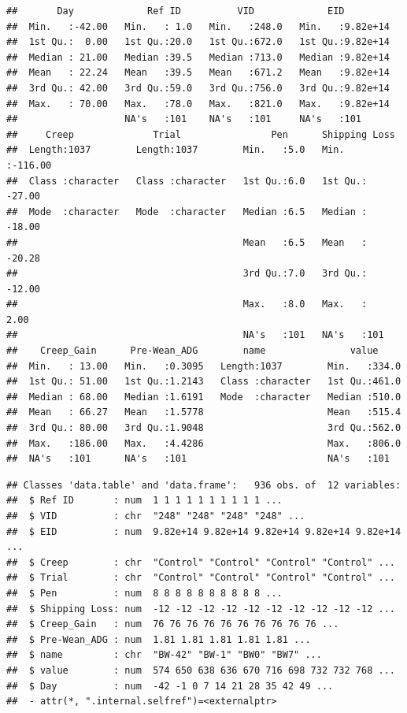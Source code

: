 \documentclass[
]{book}
\newenvironment{Shaded}{\begin{snugshade}}{\end{snugshade}}
\newcommand{\CommentTok}[1]{\textcolor[rgb]{0.56,0.35,0.01}{\textit{#1}}}
\newcommand{\FunctionTok}[1]{\textcolor[rgb]{0.13,0.29,0.53}{\textbf{#1}}}
\newcommand{\NormalTok}[1]{#1}
\newcommand{\OtherTok}[1]{\textcolor[rgb]{0.56,0.35,0.01}{#1}}
\newcommand{\SpecialCharTok}[1]{\textcolor[rgb]{0.81,0.36,0.00}{\textbf{#1}}}
\begin{document}
\begin{verbatim}
##       Day             Ref ID          VID             EID          
##  Min.   :-42.00   Min.   : 1.0   Min.   :248.0   Min.   :9.82e+14  
##  1st Qu.:  0.00   1st Qu.:20.0   1st Qu.:672.0   1st Qu.:9.82e+14  
##  Median : 21.00   Median :39.5   Median :713.0   Median :9.82e+14  
##  Mean   : 22.24   Mean   :39.5   Mean   :671.2   Mean   :9.82e+14  
##  3rd Qu.: 42.00   3rd Qu.:59.0   3rd Qu.:756.0   3rd Qu.:9.82e+14  
##  Max.   : 70.00   Max.   :78.0   Max.   :821.0   Max.   :9.82e+14  
##                   NA's   :101    NA's   :101     NA's   :101       
##     Creep              Trial                Pen      Shipping Loss    
##  Length:1037        Length:1037        Min.   :5.0   Min.   :-116.00  
##  Class :character   Class :character   1st Qu.:6.0   1st Qu.: -27.00  
##  Mode  :character   Mode  :character   Median :6.5   Median : -18.00  
##                                        Mean   :6.5   Mean   : -20.28  
##                                        3rd Qu.:7.0   3rd Qu.: -12.00  
##                                        Max.   :8.0   Max.   :   2.00  
##                                        NA's   :101   NA's   :101      
##    Creep_Gain      Pre-Wean_ADG        name               value      
##  Min.   : 13.00   Min.   :0.3095   Length:1037        Min.   :334.0  
##  1st Qu.: 51.00   1st Qu.:1.2143   Class :character   1st Qu.:461.0  
##  Median : 68.00   Median :1.6191   Mode  :character   Median :510.0  
##  Mean   : 66.27   Mean   :1.5778                      Mean   :515.4  
##  3rd Qu.: 80.00   3rd Qu.:1.9048                      3rd Qu.:562.0  
##  Max.   :186.00   Max.   :4.4286                      Max.   :806.0  
##  NA's   :101      NA's   :101                         NA's   :101
\end{verbatim}

\begin{Shaded}
\end{Shaded}

\begin{verbatim}
## Classes 'data.table' and 'data.frame':   936 obs. of  12 variables:
##  $ Ref ID       : num  1 1 1 1 1 1 1 1 1 1 ...
##  $ VID          : chr  "248" "248" "248" "248" ...
##  $ EID          : num  9.82e+14 9.82e+14 9.82e+14 9.82e+14 9.82e+14 ...
##  $ Creep        : chr  "Control" "Control" "Control" "Control" ...
##  $ Trial        : chr  "Control" "Control" "Control" "Control" ...
##  $ Pen          : num  8 8 8 8 8 8 8 8 8 8 ...
##  $ Shipping Loss: num  -12 -12 -12 -12 -12 -12 -12 -12 -12 -12 ...
##  $ Creep_Gain   : num  76 76 76 76 76 76 76 76 76 76 ...
##  $ Pre-Wean_ADG : num  1.81 1.81 1.81 1.81 1.81 ...
##  $ name         : chr  "BW-42" "BW-1" "BW0" "BW7" ...
##  $ value        : num  574 650 638 636 670 716 698 732 732 768 ...
##  $ Day          : num  -42 -1 0 7 14 21 28 35 42 49 ...
##  - attr(*, ".internal.selfref")=<externalptr>
\end{verbatim}
\end{document}
